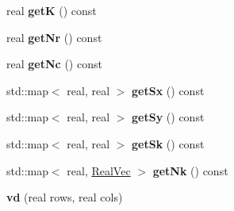 \begin{DoxyCompactItemize}
real {\bfseries getK} () const
\item 
\mbox{\label{classvd_a1a1634d6906eb0af4d877c2af3292ca7}} 
real {\bfseries get\+Nr} () const
\item 
\mbox{\label{classvd_ab0de0a5b8929ed7a7bb6ca902a462dd4}} 
real {\bfseries get\+Nc} () const
\item 
\mbox{\label{classvd_a58ca0f2dcf014942947f48d311c20d02}} 
std\+::map$<$ real, real $>$ {\bfseries get\+Sx} () const
\item 
\mbox{\label{classvd_a47295ea4089a6798c40288bac1656c91}} 
std\+::map$<$ real, real $>$ {\bfseries get\+Sy} () const
\item 
\mbox{\label{classvd_af16eada5667f835ecce3cdc2956098c9}} 
std\+::map$<$ real, real $>$ {\bfseries get\+Sk} () const
\item 
\mbox{\label{classvd_af4a6bc90137ebfe5242fbcd36524bf5b}} 
std\+::map$<$ real, \mbox{\hyperlink{aux_8h_ac0a1a538b45426e056715d1f59f854ab}{Real\+Vec}} $>$ {\bfseries get\+Nk} () const
\item 
\mbox{\label{classvd_a765c16ee377a2a0f9651d555edd3a158}} 
{\bfseries vd} (real rows, real cols)
\end{DoxyCompactItemize}
